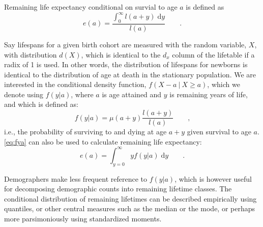 \documentclass{article}
\newcommand{\dd}{\; \mathrm{d}}
\newcommand{\tc}{\quad\quad\text{,}}
\newcommand{\tp}{\quad\quad\text{.}}
\begin{document}
Remaining life expectancy conditional on survial to age $a$ is defined as
\begin{equation}
e(a) = \frac{\int_0^\infty l(a+y) \dd y}{l(a)} \tp
\end{equation}

Say lifespans for a given birth cohort are measured with the random variable,
$X$, with distribution $d(X)$, which is identical to the $d_x$
column of the lifetable if a radix of 1 is used. In other words, the
distribution of lifespans for newborns is identical to the distribution of
age at death in the stationary population. We are interested in the
conditional density function, $f(X-a ~|~ X \ge a)$, which we denote using
$f(y|a)$, where $a$ is age attained and $y$ is remaining years of life, and
which is defined as:
\begin{equation}
\label{eq:fya}
f(y|a) = \mu(a+y) \frac{l(a+y)}{l(a)} \tc
\end{equation}
i.e., the probability of surviving to and dying at age $a+y$ given survival to
age $a$. \eqref{eq:fya} can also be used to calculate remaining life expectancy:
\begin{equation}
e(a) = \int _{y=0}^\infty y f(y|a) \dd y \tp
\end{equation}

Demographers make less frequent
reference to $f(y|a)$, which is however useful for decomposing
demographic counts into remaining lifetime classes. The conditional distribution of remaining lifetimes can be
described empirically using quantiles, or other central measures such as the
median or the mode, or perhaps more parsimoniously using standardized moments.
\end{document}
